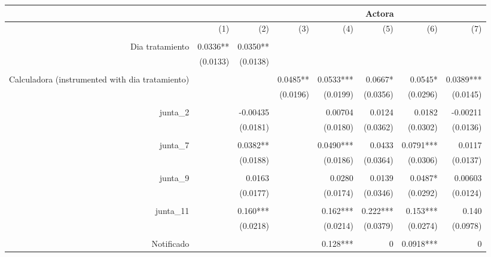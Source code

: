 \begin{tabular}{rrrrrrrr}
\toprule
      &       &       & \multicolumn{5}{c}{Actora} \\
\midrule
      & (1)   & (2)   & (3)   & (4)   & (5)   & (6)   & (7) \\
      &       &       &       &       &       &       &  \\
Dia tratamiento & 0.0336** & 0.0350** &       &       &       &       &  \\
      & (0.0133) & (0.0138) &       &       &       &       &  \\
      &       &       &       &       &       &       &  \\
Calculadora (instrumented with dia tratamiento) &       &       & 0.0485** & 0.0533*** & 0.0667* & 0.0545* & 0.0389*** \\
      &       &       & (0.0196) & (0.0199) & (0.0356) & (0.0296) & (0.0145) \\
      &       &       &       &       &       &       &  \\
junta\_2 &       & -0.00435 &       & 0.00704 & 0.0124 & 0.0182 & -0.00211 \\
      &       & (0.0181) &       & (0.0180) & (0.0362) & (0.0302) & (0.0136) \\
      &       &       &       &       &       &       &  \\
junta\_7 &       & 0.0382** &       & 0.0490*** & 0.0433 & 0.0791*** & 0.0117 \\
      &       & (0.0188) &       & (0.0186) & (0.0364) & (0.0306) & (0.0137) \\
      &       &       &       &       &       &       &  \\
junta\_9 &       & 0.0163 &       & 0.0280 & 0.0139 & 0.0487* & 0.00603 \\
      &       & (0.0177) &       & (0.0174) & (0.0346) & (0.0292) & (0.0124) \\
      &       &       &       &       &       &       &  \\
junta\_11 &       & 0.160*** &       & 0.162*** & 0.222*** & 0.153*** & 0.140 \\
      &       & (0.0218) &       & (0.0214) & (0.0379) & (0.0274) & (0.0978) \\
      &       &       &       &       &       &       &  \\
Notificado &       &       &       & 0.128*** & 0     & 0.0918*** & 0 \\

\end{tabular}
